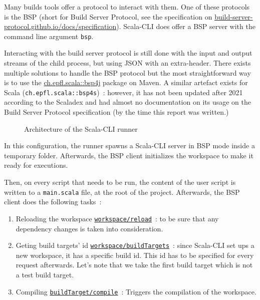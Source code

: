 \documentclass{article}
\begin{document}
Many builds tools offer a protocol to interact with them. One of these protocols is the BSP (short for Build Server Protocol, see the specification on \href{https://build-server-protocol.github.io/docs/specification}{build-server-protocol.github.io/docs/specification}). Scala-CLI does offer a BSP server with the command line argument \lstinline{bsp}.

Interacting with the build server protocol is still done with the input and output streams of the child process, but using JSON with an extra-header. There exists multiple solutions to handle the BSP protocol but the most straightforward way is to use the \href{https://mvnrepository.com/artifact/ch.epfl.scala/bsp4j}{ch.epfl.scala::bsp4j} package on Maven. A similar artefact exists for Scala (\lstinline{ch.epfl.scala::bsp4s})~: however, it has not been updated after 2021 according to the Scaladex and had almost no documentation on its usage on the Build Server Protocol specification (by the time this report was written.)

\begin{figure}[H]
    \centering
    
    \caption{Architecture of the Scala-CLI runner}
\end{figure}

In this configuration, the runner spawns a Scala-CLI server in BSP mode inside a temporary folder. Afterwards, the BSP client initializes the workspace to make it ready for executions.

Then, on every script that needs to be run, the content of the user script is written to a \lstinline{main.scala} file, at the root of the project. Afterwards, the BSP client does the following tasks~:

\begin{enumerate}
    \item Reloading the workspace \href{https://build-server-protocol.github.io/docs/specification#reload-request}{\lstinline{workspace/reload}}~: to be sure that any dependency changes is taken into consideration.
    \item Geting build targets' id \href{https://build-server-protocol.github.io/docs/specification#workspace-build-targets-request}{\lstinline{workspace/buildTargets}}~: since Scala-CLI set ups a new workspace, it has a specific build id. This id has to be specified for every request afterwards. Let's note that we take the first build target which is not a test build target.
    \item Compiling \href{https://build-server-protocol.github.io/docs/specification#compile-request}{\lstinline{buildTarget/compile}}~: Triggers the compilation of the workspace.
\end{enumerate}
\end{document}
